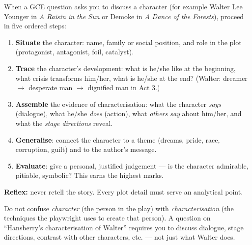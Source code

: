 \documentclass[11pt]{article}
\begin{document}
\begin{methode}
When a GCE question asks you to discuss a character (for example Walter Lee Younger in \emph{A Raisin in the Sun} or Demoke in \emph{A Dance of the Forests}), proceed in five ordered steps:
\begin{enumerate}
\item \textbf{Situate} the character: name, family or social position, and role in the plot (protagonist, antagonist, foil, catalyst).
\item \textbf{Trace} the character's development: what is he/she like at the beginning, what crisis transforms him/her, what is he/she at the end? (Walter: dreamer $\rightarrow$ desperate man $\rightarrow$ dignified man in Act 3.)
\item \textbf{Assemble} the evidence of characterisation: what the character \emph{says} (dialogue), what he/she \emph{does} (action), what \emph{others say} about him/her, and what the \emph{stage directions} reveal.
\item \textbf{Generalise}: connect the character to a theme (dreams, pride, race, corruption, guilt) and to the author's message.
\item \textbf{Evaluate}: give a personal, justified judgement — is the character admirable, pitiable, symbolic? This earns the highest marks.
\end{enumerate}
\textbf{Reflex:} never retell the story. Every plot detail must serve an analytical point.
\end{methode}

\begin{attention}
Do not confuse \emph{character} (the person in the play) with \emph{characterisation} (the techniques the playwright uses to create that person). A question on ``Hansberry's characterisation of Walter'' requires you to discuss dialogue, stage directions, contrast with other characters, etc. — not just what Walter does.
\end{attention}
\end{document}
